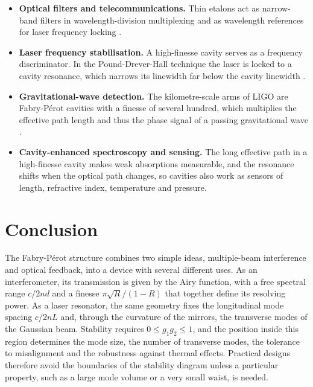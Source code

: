 \documentclass[11pt,a4paper]{article}
\newcommand{\FP}{Fabry-P\'erot}
\begin{document}
	\begin{itemize}
		\item \textbf{Optical filters and telecommunications.} Thin etalons act as narrow-band filters in wavelength-division multiplexing and as wavelength references for laser frequency locking \cite{Hecht,Yariv}.
		\item \textbf{Laser frequency stabilisation.} A high-finesse cavity serves as a frequency discriminator. In the Pound-Drever-Hall technique the laser is locked to a cavity resonance, which narrows its linewidth far below the cavity linewidth \cite{Drever1983}.
		\item \textbf{Gravitational-wave detection.} The kilometre-scale arms of LIGO are \FP{} cavities with a finesse of several hundred, which multiplies the effective path length and thus the phase signal of a passing gravitational wave \cite{Abbott2009}.
		\item \textbf{Cavity-enhanced spectroscopy and sensing.} The long effective path in a high-finesse cavity makes weak absorptions measurable, and the resonance shifts when the optical path changes, so cavities also work as sensors of length, refractive index, temperature and pressure.
	\end{itemize}
	
	\section{Conclusion}
	
	The \FP{} structure combines two simple ideas, multiple-beam interference and optical feedback, into a device with several different uses. As an interferometer, its transmission is given by the Airy function, with a free spectral range $c/2nd$ and a finesse $\pi\sqrt R/(1-R)$ that together define its resolving power. As a laser resonator, the same geometry fixes the longitudinal mode spacing $c/2nL$ and, through the curvature of the mirrors, the transverse modes of the Gaussian beam. Stability requires $0\le g_1g_2\le1$, and the position inside this region determines the mode size, the number of transverse modes, the tolerance to misalignment and the robustness against thermal effects. Practical designs therefore avoid the boundaries of the stability diagram unless a particular property, such as a large mode volume or a very small waist, is needed.
	
\end{document}
